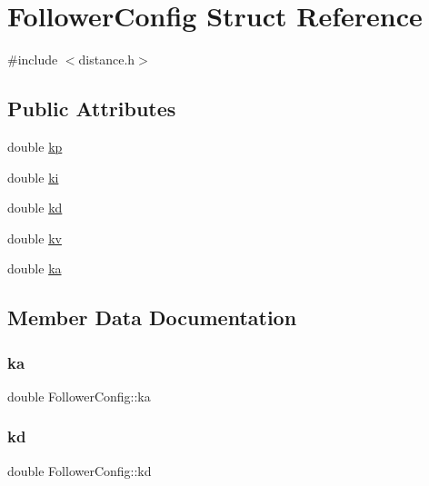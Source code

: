 \hypertarget{structFollowerConfig}{}\section{Follower\+Config Struct Reference}
\label{structFollowerConfig}


{\ttfamily \#include $<$distance.\+h$>$}

\subsection*{Public Attributes}
\begin{DoxyCompactItemize}
\item 
double \mbox{\hyperlink{structFollowerConfig_afe874822d268765aadee0cf1f3ae3ff6}{kp}}
\item 
double \mbox{\hyperlink{structFollowerConfig_ad40fa35c7cc042d9d0e05afbbfad2acb}{ki}}
\item 
double \mbox{\hyperlink{structFollowerConfig_af7e7a15a9620035c5635e86760765af1}{kd}}
\item 
double \mbox{\hyperlink{structFollowerConfig_ae54028c47cf1d3ccad3b8915d0755055}{kv}}
\item 
double \mbox{\hyperlink{structFollowerConfig_a0ea1da2f171b1f4faf0ccb0e6a16ebe4}{ka}}
\end{DoxyCompactItemize}


\subsection{Member Data Documentation}
\mbox{\label{structFollowerConfig_a0ea1da2f171b1f4faf0ccb0e6a16ebe4}} 
\subsubsection{\texorpdfstring{ka}{ka}}
{\footnotesize\ttfamily double Follower\+Config\+::ka}

\mbox{\label{structFollowerConfig_af7e7a15a9620035c5635e86760765af1}} 
\subsubsection{\texorpdfstring{kd}{kd}}
{\footnotesize\ttfamily double Follower\+Config\+::kd}

